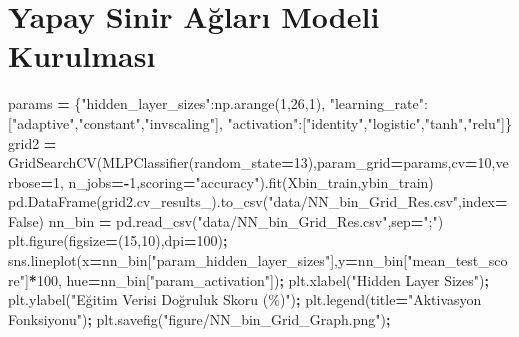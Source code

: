 \documentclass[12pt,twoside]{deuthesis}
\newenvironment{Shaded}{\begin{snugshade}}{\end{snugshade}}
\newcommand{\DecValTok}[1]{\textcolor[rgb]{0.00,0.00,0.81}{#1}}
\newcommand{\NormalTok}[1]{#1}
\newcommand{\OperatorTok}[1]{\textcolor[rgb]{0.81,0.36,0.00}{\textbf{#1}}}
\newcommand{\StringTok}[1]{\textcolor[rgb]{0.31,0.60,0.02}{#1}}
\newcommand{\VariableTok}[1]{\textcolor[rgb]{0.00,0.00,0.00}{#1}}
\begin{document}
\hypertarget{yapay-sinir-aux11flarux131-modeli-kurulmasux131-1}{%
\section{Yapay Sinir Ağları Modeli Kurulması}\label{yapay-sinir-aux11flarux131-modeli-kurulmasux131-1}}

\scriptsize
\begin{Shaded}
\begin{Highlighting}[]
\NormalTok{params }\OperatorTok{=}\NormalTok{ \{}\StringTok{"hidden\_layer\_sizes"}\NormalTok{:np.arange(}\DecValTok{1}\NormalTok{,}\DecValTok{26}\NormalTok{,}\DecValTok{1}\NormalTok{),}
          \StringTok{"learning\_rate"}\NormalTok{:[}\StringTok{"adaptive"}\NormalTok{,}\StringTok{"constant"}\NormalTok{,}\StringTok{"invscaling"}\NormalTok{],}
          \StringTok{"activation"}\NormalTok{:[}\StringTok{"identity"}\NormalTok{,}\StringTok{"logistic"}\NormalTok{,}\StringTok{"tanh"}\NormalTok{,}\StringTok{"relu"}\NormalTok{]\}}
\NormalTok{grid2 }\OperatorTok{=}\NormalTok{ GridSearchCV(MLPClassifier(random\_state}\OperatorTok{=}\DecValTok{13}\NormalTok{),param\_grid}\OperatorTok{=}\NormalTok{params,cv}\OperatorTok{=}\DecValTok{10}\NormalTok{,verbose}\OperatorTok{=}\DecValTok{1}\NormalTok{,}
\NormalTok{                     n\_jobs}\OperatorTok{={-}}\DecValTok{1}\NormalTok{,scoring}\OperatorTok{=}\StringTok{"accuracy"}\NormalTok{).fit(Xbin\_train,ybin\_train)}
\NormalTok{pd.DataFrame(grid2.cv\_results\_).to\_csv(}\StringTok{"data/NN\_bin\_Grid\_Res.csv"}\NormalTok{,index}\OperatorTok{=}\VariableTok{False}\NormalTok{)}
\NormalTok{nn\_bin }\OperatorTok{=}\NormalTok{ pd.read\_csv(}\StringTok{"data/NN\_bin\_Grid\_Res.csv"}\NormalTok{,sep}\OperatorTok{=}\StringTok{";"}\NormalTok{)}
\NormalTok{plt.figure(figsize}\OperatorTok{=}\NormalTok{(}\DecValTok{15}\NormalTok{,}\DecValTok{10}\NormalTok{),dpi}\OperatorTok{=}\DecValTok{100}\NormalTok{)}\OperatorTok{;}
\NormalTok{sns.lineplot(x}\OperatorTok{=}\NormalTok{nn\_bin[}\StringTok{"param\_hidden\_layer\_sizes"}\NormalTok{],y}\OperatorTok{=}\NormalTok{nn\_bin[}\StringTok{"mean\_test\_score"}\NormalTok{]}\OperatorTok{*}\DecValTok{100}\NormalTok{,}
\NormalTok{             hue}\OperatorTok{=}\NormalTok{nn\_bin[}\StringTok{"param\_activation"}\NormalTok{])}\OperatorTok{;}
\NormalTok{plt.xlabel(}\StringTok{"Hidden Layer Sizes"}\NormalTok{)}\OperatorTok{;}
\NormalTok{plt.ylabel(}\StringTok{"Eğitim Verisi Doğruluk Skoru (\%)"}\NormalTok{)}\OperatorTok{;}
\NormalTok{plt.legend(title}\OperatorTok{=}\StringTok{"Aktivasyon Fonksiyonu"}\NormalTok{)}\OperatorTok{;}
\NormalTok{plt.savefig(}\StringTok{"figure/NN\_bin\_Grid\_Graph.png"}\NormalTok{)}\OperatorTok{;}
\end{Highlighting}
\end{Shaded}
\end{document}
